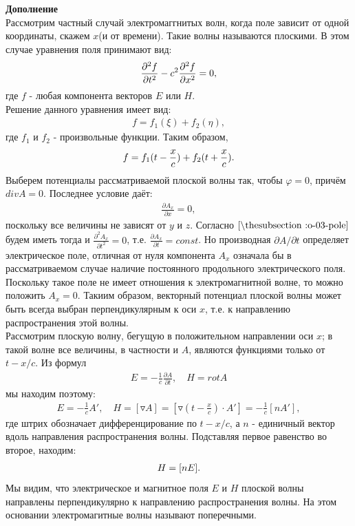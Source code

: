\documentclass[__main__.tex]{subfiles}
\begin{document}
\textbf{Дополнение}\\
Рассмотрим частный случай электромаггнитых волн, когда поле зависит от одной координаты, скажем $x$(и от времени). Такие волны называются плоскими. В этом случае уравнения поля принимают вид:
\begin{gather}
\llabel{o-03-pole}
\frac{\partial^2f}{\partial t^2} - c^2\frac{\partial^2f}{\partial x^2} = 0,
\end{gather}
где $f$ - любая компонента векторов $E$ или $H$.\\ 
Решение данного уравнения имеет вид:
\begin{gather*}
f = f_1(\xi) + f_2(\eta),
\end{gather*}
где $f_1$ и $f_2$ - произвольные функции. Таким образом,
\begin{gather}
\llabel{o-03-f}
f = f_1(t - \frac{x}{c}) + f_2(t + \frac{x}{c}).
\end{gather}
Выберем потенциалы рассматриваемой плоской волны так, чтобы $\varphi = 0$, причём  $div A = 0$. Последнее условие даёт:
\begin{gather*}
\frac{\partial A_x}{\partial x} = 0,
\end{gather*}
поскольку все величины не зависят от $y$ и $z$. Согласно $\lref{o-03-pole}$ будем иметь тогда и $\frac{\partial^2A_x}{\partial t^2} = 0$, т.е. $\frac{\partial A_x}{\partial t} = const$. Но производная $\partial A/\partial t$ определяет электрическое поле, отличная от нуля компонента $A_x$ означала бы в рассматриваемом случае наличие постоянного продольного электрического поля. Поскольку такое поле не имеет отношения к электромагнитной волне, то можно положить $A_x = 0$.
Такиим образом, векторный потенциал плоской волны может быть всегда выбран перпендикулярным к оси $x$, т.е. к направлению распространения этой волны.\\
Рассмотрим плоскую волну, бегущую в положительном направлении оси $x$; в такой волне все величины, в частности и $A$, являются функциями только от $t - x/c$. Из формул
\begin{gather*}
E = -\frac{1}{c}\frac{\partial A}{\partial t}, \quad H = rot A
\end{gather*}
мы находим поэтому:
\begin{gather*}
E = -\frac{1}{c}A', \quad H = [\triangledown A] = [\triangledown (t - \frac{x}{c})\cdot A'] = -\frac{1}{c}[nA'],
\end{gather*}
где штрих обозначает дифференцирование по $t - x/c$, а $n$ - единичный вектор вдоль направления распространения волны. Подставляя первое равенство во второе, находим:
\begin{gather}
\llabel{o-03-H}
H = [nE].
\end{gather}
Мы видим, что электрическое и магнитное поля $E$ и $H$ плоской волны направлены перпендикулярно к направлению распространения волны. На этом основании электромагитные волны называют поперечными.\\
\end{document}
